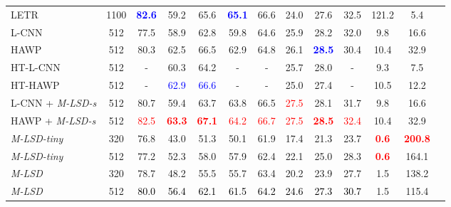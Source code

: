 \documentclass[letterpaper]{article} \usepackage{aaai22}  \usepackage{times}  \usepackage{helvet}  \usepackage{courier}  \usepackage[hyphens]{url}  \usepackage{graphicx} \urlstyle{rm} \def\UrlFont{\rm}  \usepackage{natbib}  \usepackage{caption} \DeclareCaptionStyle{ruled}{labelfont=normalfont,labelsep=colon,strut=off} \frenchspacing  \setlength{\pdfpagewidth}{8.5in}  \setlength{\pdfpageheight}{11in}  \usepackage{algorithm}
\begin{document}
\begin{table*}[t!]
\begin{adjustbox}{width=0.8\textwidth,center}
\begin{tabular}{lcccccccccccc}
LETR~\cite{xu2021line}& 1100                    & \textcolor{blue}{\textbf{82.6}}  & 59.2  & 65.6   & \textcolor{blue}{\textbf{65.1}} & 66.6  & 24.0  & 27.6   & 32.5 & 121.2                        & 5.4                 \\
L-CNN~\cite{zhou2019end} & 512                    & 77.5  & 58.9  & 62.8   & 59.8 & 64.6  & 25.9  & 28.2   & 32.0 & 9.8                        & 16.6                 \\
HAWP~\cite{xue2020holistically}& 512                    & 80.3  & 62.5  & 66.5   & 62.9 & 64.8  & 26.1  & \textcolor{blue}{\textbf{28.5}}   & 30.4 & 10.4                       & 32.9                 \\
HT-L-CNN~\cite{lin2020deep}& 512                    & -  & 60.3  & 64.2   & -  & -  & 25.7   & 28.0 & - & 9.3                       & 7.5                 \\
HT-HAWP~\cite{lin2020deep}& 512                    & -  & \textcolor{blue}{62.9}  & \textcolor{blue}{66.6}   & - & -  & 25.0  & 27.4   & - & 10.5                       & 12.2                 \\
\midrule
L-CNN + \textit{M-LSD-s} & 512                    & 80.7  & 59.4  & 63.7   & 63.8 & 66.5  & \textcolor{Red}{27.5}  & 28.1   & 31.7 & 9.8                        & 16.6                 \\
HAWP + \textit{M-LSD-s} & 512                    & \textcolor{Red}{82.5}  & \textcolor{Red}{\textbf{63.3}}  & \textcolor{Red}{\textbf{67.1}}   & \textcolor{Red}{64.2} & \textcolor{Red}{66.7}  & \textcolor{Red}{27.5}  & \textcolor{Red}{\textbf{28.5}}   & \textcolor{Red}{32.4} & 10.4                       & 32.9                 \\
\textit{M-LSD-tiny}              & 320                    & 76.8  & 43.0  & 51.3   & 50.1 & 61.9  & 17.4  & 21.3   & 23.7 & \textcolor{Red}{\textbf{0.6}}                        & \textcolor{Red}{\textbf{200.8}}                \\
\textit{M-LSD-tiny}              & 512                    & 77.2  & 52.3  & 58.0   & 57.9 & 62.4  & 22.1  & 25.0   & 28.3 & \textcolor{Red}{\textbf{0.6}}                        & 164.1                \\
\textit{M-LSD}                   & 320                    & 78.7  & 48.2  & 55.5   & 55.7 & 63.4  & 20.2  & 23.9   & 27.7 & 1.5                        & 138.2                \\
\textit{M-LSD}                   & 512                    & \textcolor{Black}{80.0}  & \textcolor{Black}{56.4}  & \textcolor{Black}{62.1}   & \textcolor{Black}{61.5} & \textcolor{Black}{64.2}  & \textcolor{Black}{24.6}  & \textcolor{Black}{27.3}   & \textcolor{Black}{30.7} & 1.5                        & 115.4               \\

\end{tabular}
\end{adjustbox}
\end{table*}
\end{document}
